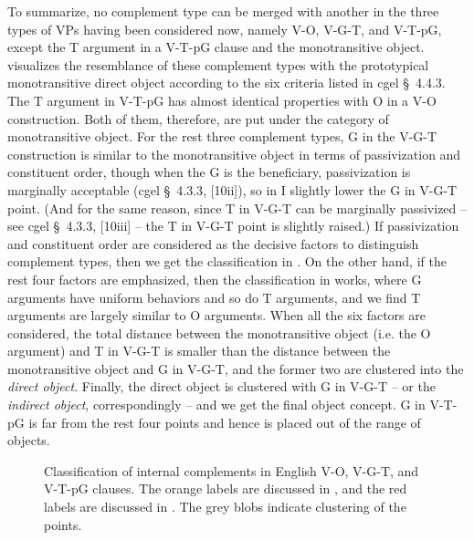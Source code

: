 \documentclass[UTF8, a4paper, oneside, scheme=plain, 12pt]{ctexbook}
\newcommand*{\citesec}[1]{\S~{#1}}
\newcommand*{\term}[1]{\emph{#1}}
\begin{document}
To summarize, no complement type can be merged with another  
in the three types of VPs having been considered now,
namely V-O, V-G-T, and V-T-pG,
except the T argument in a V-T-pG clause and the monotransitive object.
 visualizes the resemblance 
of these complement types with the prototypical monotransitive direct object 
according to the six criteria listed in \ac{cgel} \citesec{4.4.3}.
The T argument in V-T-pG has almost identical properties
with O in a V-O construction.
Both of them, therefore, are put under the category of monotransitive object.
For the rest three complement types,
G in the V-G-T construction is similar to the monotransitive object 
in terms of passivization and constituent order,
though when the G is the beneficiary,
passivization is marginally acceptable (\ac{cgel} \citesec{4.3.3}, [10ii]),
so in  I slightly lower the G in V-G-T point.
(And for the same reason, since T in V-G-T can be marginally passivized 
-- see \ac{cgel} \citesec{4.3.3}, [10iii] --
the T in V-G-T point is slightly raised.)
If passivization and constituent order are considered as the decisive factors to distinguish complement types,
then we get the classification in .
On the other hand, if the rest four factors are emphasized,
then the classification in  works,
where G arguments have uniform behaviors 
and so do T arguments,
and we find T arguments are largely similar to O arguments.
When all the six factors are considered,
the total distance between the monotransitive object (i.e. the O argument)
and T in V-G-T is smaller than 
the distance between the monotransitive object and G in V-G-T,
and the former two are clustered into the \term{direct object}.
Finally, the direct object is clustered with G in V-G-T 
-- or the \term{indirect object}, correspondingly -- 
and we get the final object concept.
G in V-T-pG is far from the rest four points 
and hence is placed out of the range of objects.

\begin{figure}[H]
    \centering
    
    \caption{Classification of internal complements in English V-O, V-G-T, and V-T-pG clauses.
    The orange labels are discussed in ,
    and the red labels are discussed in .
    The grey blobs indicate clustering of the points.}
    \label{fig:english-object}
\end{figure}
\end{document}
